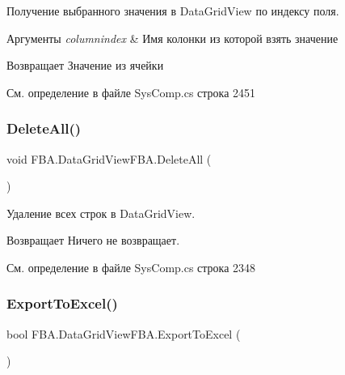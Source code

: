 Получение выбранного значения в Data\+Grid\+View по индексу поля. 


\begin{DoxyParams}{Аргументы}
{\em columnindex} & Имя колонки из которой взять значение\\
\hline
\end{DoxyParams}
\begin{DoxyReturn}{Возвращает}
Значение из ячейки
\end{DoxyReturn}


См. определение в файле Sys\+Comp.\+cs строка 2451

\mbox{\label{class_f_b_a_1_1_data_grid_view_f_b_a_ad9ddb7187b269c1b65cfc252fed9e36f}} 
\subsubsection{\texorpdfstring{Delete\+All()}{DeleteAll()}}
{\footnotesize\ttfamily void F\+B\+A.\+Data\+Grid\+View\+F\+B\+A.\+Delete\+All (\begin{DoxyParamCaption}{ }\end{DoxyParamCaption})}



Удаление всех строк в Data\+Grid\+View. 

\begin{DoxyReturn}{Возвращает}
Ничего не возвращает.
\end{DoxyReturn}


См. определение в файле Sys\+Comp.\+cs строка 2348

\mbox{\label{class_f_b_a_1_1_data_grid_view_f_b_a_a06d59fa96611473544e9f43418ccb307}} 
\subsubsection{\texorpdfstring{Export\+To\+Excel()}{ExportToExcel()}}
{\footnotesize\ttfamily bool F\+B\+A.\+Data\+Grid\+View\+F\+B\+A.\+Export\+To\+Excel (\begin{DoxyParamCaption}{ }\end{DoxyParamCaption})}



